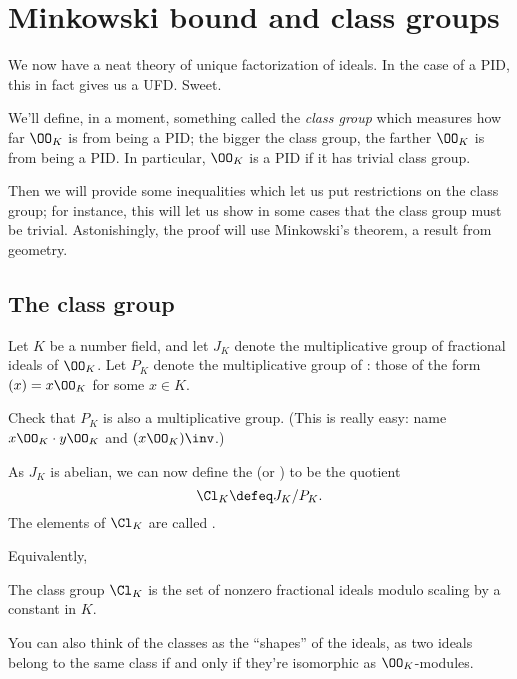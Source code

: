 \chapter{Minkowski bound and class groups}
\label{ch:class_groups}
We now have a neat theory of unique factorization of ideals.
In the case of a PID, this in fact gives us a UFD. Sweet.

We'll define, in a moment, something called the \emph{class group}
which measures how far $\OO_K$ is from being a PID;
the bigger the class group, the farther $\OO_K$ is from being a PID.
In particular, $\OO_K$ is a PID if it has trivial class group.

Then we will provide some inequalities which let us put restrictions on the class group;
for instance, this will let us show in some cases that the class group must be trivial.
Astonishingly, the proof will use Minkowski's theorem, a result from geometry.

\section{The class group}
Let $K$ be a number field,
and let $J_K$ denote the multiplicative group of fractional ideals of $\OO_K$.
Let $P_K$ denote the multiplicative group of :
those of the form $(x) = x \OO_K$ for some $x \in K$.
\begin{ques}
Check that $P_K$ is also a multiplicative group.
(This is really easy: name $x\OO_K \cdot y\OO_K$ and $(x\OO_K)\inv$.)
\end{ques}
As $J_K$ is abelian, we can now define the  (or ) to be the quotient
\[ \Cl_K \defeq J_K / P_K. \]
The elements of $\Cl_K$ are called .

Equivalently,
\begin{moral}
The class group $\Cl_K$ is the set of nonzero fractional ideals modulo
scaling by a constant in $K$.
\end{moral}

You can also think of the classes as the ``shapes'' of the ideals,
as two ideals belong to the same class if and only if
they're isomorphic as $\OO_K$-modules.

